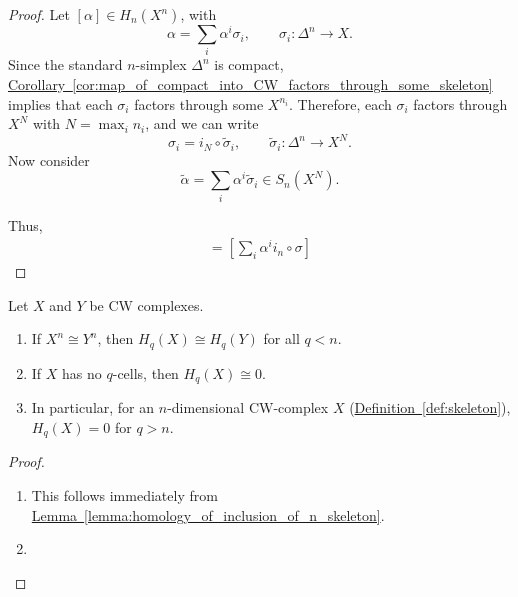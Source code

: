 \documentclass[main.tex]{subfiles}
\begin{document}
\begin{proof}
  Let $[\alpha] \in H_{n}(X^{n})$, with
  \begin{equation*}
    \alpha = \sum_{i} \alpha^{i} \sigma_{i},\qquad \sigma_{i}\colon \Delta^{n} \to X.
  \end{equation*}
  Since the standard $n$-simplex $\Delta^{n}$ is compact, \hyperref[cor:map_of_compact_into_CW_factors_through_some_skeleton]{Corollary~\ref*{cor:map_of_compact_into_CW_factors_through_some_skeleton}} implies that each $\sigma_{i}$ factors through some $X^{n_{i}}$. Therefore, each $\sigma_{i}$ factors through $X^{N}$ with $N = \max_{i} n_{i}$, and we can write
  \begin{equation*}
    \sigma_{i} = i_{N} \circ \tilde{\sigma}_{i},\qquad \tilde{\sigma}_{i}\colon \Delta^{n} \to X^{N}.
  \end{equation*}
  Now consider
  \begin{equation*}
    \tilde{\alpha} = \sum_{i} \alpha^{i} \tilde{\sigma}_{i} \in S_{n}(X^{N}).
  \end{equation*}

  Thus,
  \begin{align*}
    [\alpha] = \left[ \sum_{i} \alpha^{i} i_{n} \circ \sigma \right]
  \end{align*}
\end{proof}

\begin{corollary}
  Let $X$ and $Y$ be CW complexes.
  \begin{enumerate}
    \item If $X^{n} \cong Y^{n}$, then $H_{q}(X) \cong H_{q}(Y)$ for all $q < n$.

    \item If $X$ has no $q$-cells, then $H_{q}(X) \cong 0$.

    \item In particular, for an $n$-dimensional CW-complex $X$ (\hyperref[def:skeleton]{Definition~\ref*{def:skeleton}}), $H_{q}(X) = 0$ for $q > n$.
  \end{enumerate}
\end{corollary}
\begin{proof}
  \leavevmode
  \begin{enumerate}
    \item This follows immediately from \hyperref[lemma:homology_of_inclusion_of_n_skeleton]{Lemma~\ref*{lemma:homology_of_inclusion_of_n_skeleton}}.

    \item 
  \end{enumerate}
\end{proof}
\end{document}
